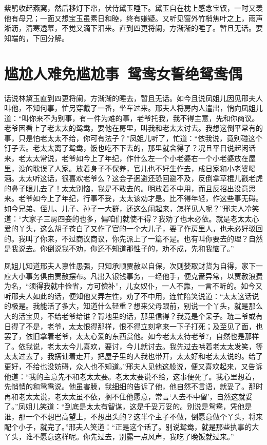 \documentclass[12pt,oneside]{book}
\begin{document}
紫鹃收起燕窝，然后移灯下帘，伏侍黛玉睡下。黛玉自在枕上感念宝钗，一时又羡他有母兄；一面又想宝玉虽素日和睦，终有嫌疑。又听见窗外竹梢焦叶之上，雨声淅沥，清寒透幕，不觉又滴下泪来。直到四更将阑，方渐渐的睡了。暂且无话。要知端的，下回分解。


 
\chapter{尴尬人难免尴尬事~鸳鸯女誓绝鸳鸯偶}
话说林黛玉直到四更将阑，方渐渐的睡去，暂且无话。如今且说凤姐儿因见邢夫人叫他，不知何事，忙另穿戴了一番，坐车过来。邢夫人将房内人遣出，悄向凤姐儿道：“叫你来不为别事，有一件为难的事，老爷托我，我不得主意，先和你商议。老爷因看上了老太太的鸳鸯，要他在房里，叫我和老太太讨去。我想这倒平常有的事，只是怕老太太不给，你可有法子？”凤姐儿听了，忙道：“依我说，竟别碰这个钉子去。老太太离了鸳鸯，饭也吃不下去的，那里就舍得了？况且平日说起闲话来，老太太常说，老爷如今上了年纪，作什么左一个小老婆右一个小老婆放在屋里，没的耽误了人家。放着身子不保养，官儿也不好生作去，成日家和小老婆喝酒。太太听这话，很喜欢老爷么？这会子迥避还恐回避不及，反倒拿草棍儿戳老虎的鼻子眼儿去了！太太别恼，我是不敢去的。明放着不中用，而且反招出没意思来。老爷如今上了年纪，行事不妥，太太该劝才是。比不得年轻，作这些事无碍。如今兄弟、侄儿、儿子、孙子一大群，还这么闹起来，怎样见人呢？”邢夫人冷笑道：“大家子三房四妾的也多，偏咱们就使不得？我劝了也未必依。就是老太太心爱的丫头，这么胡子苍白了又作了官的一个大儿子，要了作房里人，也未必好驳回的。我叫了你来，不过商议商议，你先派上了一篇不是。也有叫你要去的理？自然是我说去。你倒说我不劝，你还不知道那性子的，劝不成，先和我恼了。”

凤姐儿知道邢夫人禀性愚强，只知承顺贾赦以自保，次则婪取财货为自得，家下一应大小事务俱由贾赦摆布。凡出入银钱事务，一经他手，便克啬异常，以贾赦浪费为名，“须得我就中俭省，方可偿补”，儿女奴仆，一人不靠，一言不听的。如今又听邢夫人如此的话，便知他又弄左性，劝了不中用，连忙陪笑说道：“太太这话说的极是。我能活了多大，知道什么轻重？想来父母跟前，别说一个丫头，就是那么大的活宝贝，不给老爷给谁？背地里的话，那里信得？我竟是个呆子。琏二爷或有日得了不是，老爷，太太恨得那样，恨不得立刻拿来一下子打死；及至见了面，也罢了，依旧拿着老爷，太太心爱的东西赏他。如今老太太待老爷?，自然也是那样了。依我说，老太太今儿喜欢，要讨，今儿就讨去。我先过去哄着老太太发笑，等太太过去了，我搭讪着走开，把屋子里的人我也带开，太太好和老太太说的。给了更好，不给也没妨碍，众人也不知道。”邢夫人见他这般说，便又喜欢起来，又告诉他道：“我的主意先不和老太太要。老太太要说不给，这事便死了。我心里想着，先悄悄的和鸳鸯说。他虽害臊，我细细的告诉了他，他自然不言语，就妥了。那时再和老太太说，老太太虽不依，搁不住他愿意，常言‘人去不中留’，自然这就妥了。”凤姐儿笑道：“到底是太太有智谋，这是千妥万妥的。别说是鸳鸯，凭他是谁，那一个不想巴高望上，不想出头的？这半个主子不做，倒愿意做个丫头，将来配个小子，就完了。”邢夫人笑道：“正是这个话了。别说鸳鸯，就是那些执事的大丫头，谁不愿意这样呢。你先过去，别露一点风声，我吃了晚饭就过来。”
\end{document}
